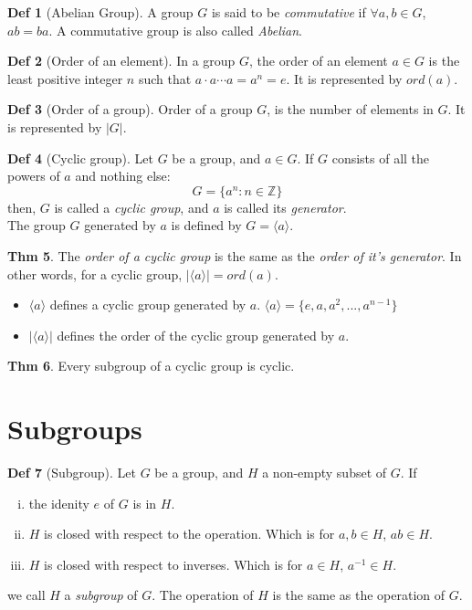 \documentclass{article}
\theoremstyle{definition}
\newtheorem{definition}{Def}[section]
\newtheorem{theorem}[definition]{Thm}
\begin{document}
\begin{definition}[Abelian Group]
    A group $G$ is said to be \emph{commutative} if $\forall a, b \in G$, $ab = ba$. A commutative group is also called \emph{Abelian}.
\end{definition}

\begin{definition}[Order of an element]
    In a group $G$, the order of an element $a \in G$ is the least positive integer $n$ such that $a \cdot a \cdots a = a^n = e$. It is represented by $ord(a)$.
\end{definition}

\begin{definition}[Order of a group]
    Order of a group $G$, is the number of elements in $G$. It is represented by $|G|$.
\end{definition}

\begin{definition}[Cyclic group]
    Let $G$ be a group, and $a \in G$. If $G$ consists of all the powers of $a$ and nothing else:
    $$G = \{a^n : n \in \mathbb{Z}\}$$
    then, $G$ is called a \emph{cyclic group}, and $a$ is called its \emph{generator}.
    \\
    The group $G$ generated by $a$ is defined by $G=\langle a \rangle$.
\end{definition}

\begin{theorem}
    The \emph{order of a cyclic group} is the same as the \emph{order of it's generator}. In other words, for a cyclic group, $|\langle a \rangle | = ord(a)$.
    \begin{itemize}
	\item[] $\langle a \rangle$ defines a cyclic group generated by $a$. $\langle a \rangle = \{e, a, a^2, ..., a^{n-1}\}$
	\item[] $| \langle a \rangle |$ defines the order of the cyclic group generated by $a$.
    \end{itemize}
\end{theorem}

\begin{theorem}
Every subgroup of a cyclic group is cyclic.
\end{theorem}



\section{Subgroups}
\begin{definition}[Subgroup]
    Let $G$ be a group, and $H$ a non-empty subset of $G$. If
    \begin{enumerate}[i.]
	\item the idenity $e$ of $G$ is in $H$.
	\item $H$ is closed with respect to the operation. Which is for $a, b \in H$, $ab \in H$.
	\item $H$ is closed with respect to inverses. Which is for $a \in H$, $a^{-1} \in H$.
    \end{enumerate}
    we call $H$ a \emph{subgroup} of $G$. The operation of $H$ is the same as the operation of $G$.
\end{definition}
\end{document}
